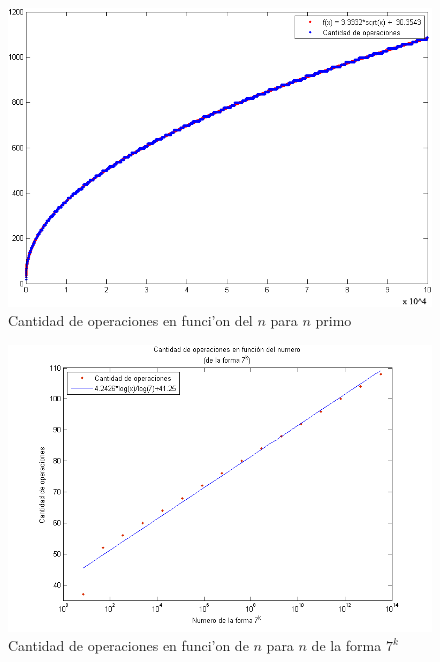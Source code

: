 \begin{figure}[H]
\centering
\includegraphics[scale=0.8]{../../codigo/ejercicio1/benchmark/graficos/primos/graficoPrimos.png}
\caption{Cantidad de operaciones en funci'on del $n$ para $n$ primo}
\label{Ej1fig2}
\end{figure}

\begin{figure}[H]
\centering
\includegraphics[scale=0.8]{../../codigo/ejercicio1/benchmark/graficos/potencias_de_7/graficoPotenciasDe7.png}
\caption{Cantidad de operaciones en funci'on de $n$ para $n$ de la forma $7^k$}
\label{Ej1fig3}
\end{figure}

